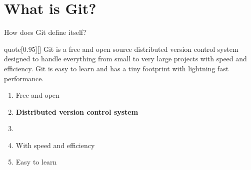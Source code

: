 \documentclass[usenames,svgnames,14pt]{beamer}
\begin{document}
\section{What is Git?}
\begin{frame}{How does Git define itself?}
    \PrepareURLsymbol[PB]
    \begin{varblock}{quote}[0.95\textwidth]{}[]
        \guillemotleft
        Git is a free and open source distributed version control system designed to handle everything from small to very large projects with speed and efficiency.
        Git is easy to learn and has a tiny footprint with lightning fast performance.\guillemotright
    \end{varblock}
    \begin{enumerate}
        \item Free and open
        \item \textbf{Distributed version control system}
        \item {}
        \item With speed and efficiency
        \item \alert{Easy to learn}
    \end{enumerate}
\end{frame}
\end{document}
